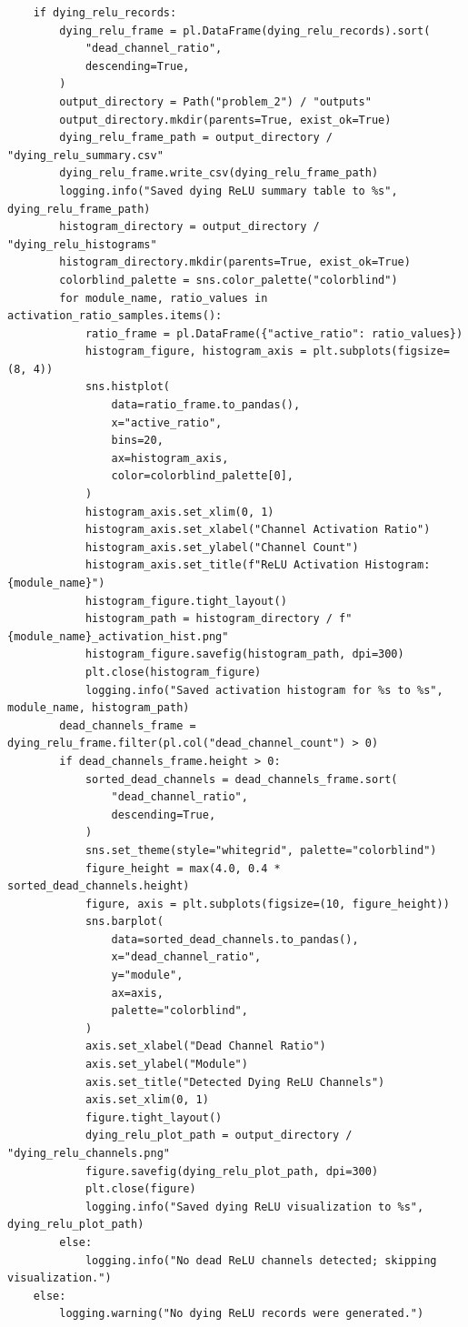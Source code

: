 \documentclass[11pt, oneside]{article}   	%
\begin{document}
\begin{answerbox}
\begin{verbatim}
    if dying_relu_records:
        dying_relu_frame = pl.DataFrame(dying_relu_records).sort(
            "dead_channel_ratio",
            descending=True,
        )
        output_directory = Path("problem_2") / "outputs"
        output_directory.mkdir(parents=True, exist_ok=True)
        dying_relu_frame_path = output_directory / "dying_relu_summary.csv"
        dying_relu_frame.write_csv(dying_relu_frame_path)
        logging.info("Saved dying ReLU summary table to %s", dying_relu_frame_path)
        histogram_directory = output_directory / "dying_relu_histograms"
        histogram_directory.mkdir(parents=True, exist_ok=True)
        colorblind_palette = sns.color_palette("colorblind")
        for module_name, ratio_values in activation_ratio_samples.items():
            ratio_frame = pl.DataFrame({"active_ratio": ratio_values})
            histogram_figure, histogram_axis = plt.subplots(figsize=(8, 4))
            sns.histplot(
                data=ratio_frame.to_pandas(),
                x="active_ratio",
                bins=20,
                ax=histogram_axis,
                color=colorblind_palette[0],
            )
            histogram_axis.set_xlim(0, 1)
            histogram_axis.set_xlabel("Channel Activation Ratio")
            histogram_axis.set_ylabel("Channel Count")
            histogram_axis.set_title(f"ReLU Activation Histogram: {module_name}")
            histogram_figure.tight_layout()
            histogram_path = histogram_directory / f"{module_name}_activation_hist.png"
            histogram_figure.savefig(histogram_path, dpi=300)
            plt.close(histogram_figure)
            logging.info("Saved activation histogram for %s to %s", module_name, histogram_path)
        dead_channels_frame = dying_relu_frame.filter(pl.col("dead_channel_count") > 0)
        if dead_channels_frame.height > 0:
            sorted_dead_channels = dead_channels_frame.sort(
                "dead_channel_ratio",
                descending=True,
            )
            sns.set_theme(style="whitegrid", palette="colorblind")
            figure_height = max(4.0, 0.4 * sorted_dead_channels.height)
            figure, axis = plt.subplots(figsize=(10, figure_height))
            sns.barplot(
                data=sorted_dead_channels.to_pandas(),
                x="dead_channel_ratio",
                y="module",
                ax=axis,
                palette="colorblind",
            )
            axis.set_xlabel("Dead Channel Ratio")
            axis.set_ylabel("Module")
            axis.set_title("Detected Dying ReLU Channels")
            axis.set_xlim(0, 1)
            figure.tight_layout()
            dying_relu_plot_path = output_directory / "dying_relu_channels.png"
            figure.savefig(dying_relu_plot_path, dpi=300)
            plt.close(figure)
            logging.info("Saved dying ReLU visualization to %s", dying_relu_plot_path)
        else:
            logging.info("No dead ReLU channels detected; skipping visualization.")
    else:
        logging.warning("No dying ReLU records were generated.")
\end{verbatim}

\end{answerbox}
\end{document}
